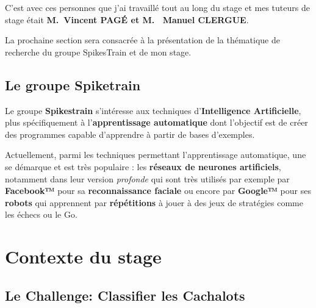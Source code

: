 C'est avec ces personnes que j'ai travaillé tout au long du stage et mes
tuteurs de stage était \textbf{M.~Vincent PAGÉ et M. ~Manuel CLERGUE}.

%

La prochaine section sera consacrée à la présentation de la thématique
de recherche du groupe SpikesTrain et de mon stage.


\hypertarget{Objectif_Spike}{%
\subsection{Le groupe Spiketrain}\label{Groupe_Spiketrain}}

Le groupe \textbf{Spikestrain} s'intéresse aux techniques
d'\textbf{Intelligence Artificielle}, plus spécifiquement à
l'\textbf{apprentissage automatique} dont l'objectif est de créer des
programmes capable d'apprendre à partir de bases d'exemples.

Actuellement, parmi les techniques permettant l'apprentissage
automatique, une se démarque et est très populaire : les
\textbf{réseaux de neurones artificiels}, notamment dans leur version
\emph{profonde} qui sont très utilisés par exemple par \textbf{Facebook™}
pour sa \textbf{reconnaissance faciale} ou encore par \textbf{Google™}
pour ses \textbf{robots} qui apprennent par \textbf{répétitions} à jouer
à des jeux de stratégies comme les échecs ou le Go.


\hypertarget{Contexte}{%
\section{Contexte du stage}\label{Contexte}}

\hypertarget{Le-Challenge}{%
\subsection{Le Challenge: Classifier les Cachalots}\label{Le-Challenge}}

